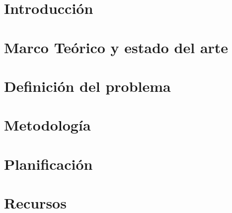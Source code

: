\documentclass[12pt,letterpaper]{report}
\begin{document}
\listoftables
\newpage

\chapter{Introducción}
   
\chapter{Marco Teórico y estado del arte}
    
\chapter{Definición del problema}
   
\chapter{Metodología}
   
\chapter{Planificación}
   
\chapter{Recursos}
   

%   


\appendix

%
%



\end{document}
